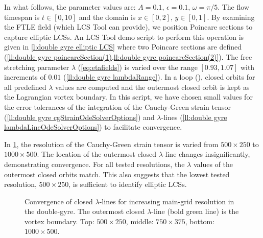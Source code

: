 \documentclass[5p]{elsarticle}
\newlength\figurewidth
\begin{document}
In what follows, the parameter values are: $A = 0.1$, $\epsilon = 0.1$, $\omega = \pi/5$. The flow timespan is $t \in [0,10]$ and the domain is $x \in [0,2]$, $y \in [0,1]$. By examining the FTLE field (which LCS Tool can provide), we position Poincare sections to capture elliptic LCSs. An LCS Tool demo script to perform this operation is given in \cref{l:double gyre elliptic LCS} where two Poincare sections are defined (\cref{ll:double gyre poincareSection(1),ll:double gyre poincareSection(2)}). The free stretching parameter $\lambda$ (\cref{eq:etafields}) is varied over the range $[0.93,1.07]$ with increments of $0.01$ (\cref{ll:double gyre lambdaRange}).
In a loop (), closed orbits for all predefined $\lambda$ values are computed and the outermost closed orbit is kept as the Lagrangian vortex boundary.
In this script, we have chosen small values for the error tolerances of the integration of the Cauchy-Green strain tensor (\cref{ll:double gyre cgStrainOdeSolverOptions}) and $\lambda$-lines (\cref{ll:double gyre lambdaLineOdeSolverOptions}) to facilitate convergence.



In \cref{f:double gyre lambda LCS convergence}, the resolution of the  Cauchy-Green strain tensor is varied from $500 \times 250$ to $1000 \times 500$. The location of the outermost closed $\lambda$-line changes insignificantly, demonstrating convergence. For all tested resolutions, the $\lambda$ values of the outermost closed orbits match.
This also suggests that the lowest tested resolution, $500 \times 250$, is sufficient to identify elliptic LCSs.

\begin{figure}
\centering
\setlength{}



\caption{Convergence of closed $\lambda$-lines for increasing main-grid resolution in the double-gyre. The outermost closed $\lambda$-line (bold green line) is the vortex boundary. Top: $500 \times 250$, middle: $750 \times 375$, bottom: $1000 \times 500$.}
\label{f:double gyre lambda LCS convergence}
\end{figure}
\end{document}
